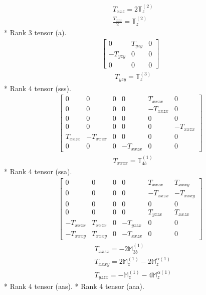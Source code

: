 \documentclass[fleqn,8pt,landscape]{jsarticle}
\begin{document}
\begin{align*}
& T_{xxz} = 2 \mathbb{T}_{z}^{(2)} \\
& \frac{T_{xxz}}{2} = \mathbb{T}_{z}^{(2)}
\end{align*}
* Rank 3 tensor (a).
\begin{align*}
\begin{bmatrix} 0 & T_{yzy} & 0 \\ - T_{yzy} & 0 & 0 \\ 0 & 0 & 0 \end{bmatrix}
\end{align*}
\begin{align*}
& T_{yzy} = \mathbb{T}_{z}^{(3)}
\end{align*}
* Rank 4 tensor (sss).
\begin{align*}
\begin{bmatrix} 0 & 0 & 0 & 0 & T_{xxzx} & 0 \\ 0 & 0 & 0 & 0 & - T_{xxzx} & 0 \\ 0 & 0 & 0 & 0 & 0 & 0 \\ 0 & 0 & 0 & 0 & 0 & - T_{xxzx} \\ T_{xxzx} & - T_{xxzx} & 0 & 0 & 0 & 0 \\ 0 & 0 & 0 & - T_{xxzx} & 0 & 0 \end{bmatrix}
\end{align*}
\begin{align*}
& T_{xxzx} = \mathbb{T}_{4b}^{(1)}
\end{align*}
* Rank 4 tensor (ssa).
\begin{align*}
\begin{bmatrix} 0 & 0 & 0 & 0 & T_{xxzx} & T_{xxxy} \\ 0 & 0 & 0 & 0 & - T_{xxzx} & - T_{xxxy} \\ 0 & 0 & 0 & 0 & 0 & 0 \\ 0 & 0 & 0 & 0 & T_{yzzx} & T_{xxzx} \\ - T_{xxzx} & T_{xxzx} & 0 & - T_{yzzx} & 0 & 0 \\ - T_{xxxy} & T_{xxxy} & 0 & - T_{xxzx} & 0 & 0 \end{bmatrix}
\end{align*}
\begin{align*}
& T_{xxzx} = - 2 \mathbb{M}_{3b}^{(1)} \\
& T_{xxxy} = 2 \mathbb{M}_{z}^{(1)} - 2 \mathbb{M}_{z}^{\alpha(1)} \\
& T_{yzzx} = - \mathbb{M}_{z}^{(1)} - 4 \mathbb{M}_{z}^{\alpha(1)}
\end{align*}
* Rank 4 tensor (aas).
* Rank 4 tensor (aaa).
\end{document}
